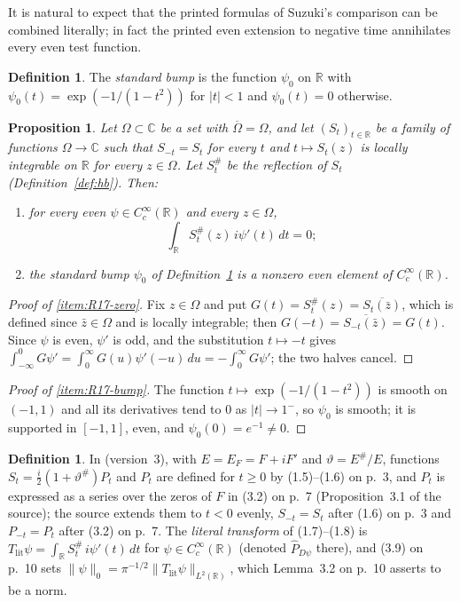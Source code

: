 \documentclass[11pt]{amsart}
\theoremstyle{plain}
\newtheorem{proposition}[theorem]{Proposition}
\theoremstyle{definition}
\newtheorem{definition}[theorem]{Definition}
\theoremstyle{remark}
\numberwithin{equation}{section}
\newcommand{\C}{\mathbb{C}}
\newcommand{\R}{\mathbb{R}}
\begin{document}
It is natural to expect that the printed formulas of Suzuki's comparison
can be combined literally; in fact the printed even extension to
negative time annihilates every even test function.

\begin{definition}\label{def:bump}
The \emph{standard bump} is the function $\psi_0$ on $\R$ with
$\psi_0(t)=\exp(-1/(1-t^2))$ for $|t|<1$ and $\psi_0(t)=0$ otherwise.
\end{definition}

\begin{proposition}\label{prop:R17}
Let $\Omega\subset\C$ be a set with $\overline\Omega=\Omega$, and let
$(S_t)_{t\in\R}$ be a family of functions $\Omega\to\C$ such that
$S_{-t}=S_t$ for every $t$ and $t\mapsto S_t(z)$ is locally integrable
on $\R$ for every $z\in\Omega$. Let $S_t^\#$ be the reflection of
$S_t$ (Definition~\ref{def:hb}). Then:
\begin{enumerate}[label=(\roman*)]
\item\label{item:R17-zero} for every even $\psi\in C_c^\infty(\R)$
  and every $z\in\Omega$,
  \[
  \int_\R S_t^\#(z)\,i\psi'(t)\,dt=0;
  \]
\item\label{item:R17-bump} the standard bump $\psi_0$ of
  Definition~\ref{def:bump} is a nonzero even element of
  $C_c^\infty(\R)$.
\end{enumerate}
\end{proposition}

\begin{proof}[Proof of \ref{item:R17-zero}]
Fix $z\in\Omega$ and put $G(t)=S_t^\#(z)=\overline{S_t(\bar z)}$,
which is defined since $\bar z\in\Omega$ and is locally integrable;
then $G(-t)=\overline{S_{-t}(\bar z)}=G(t)$. Since $\psi$ is even,
$\psi'$ is odd, and the substitution $t\mapsto-t$ gives
$\int_{-\infty}^0G\psi'=\int_0^\infty G(u)\psi'(-u)\,du
=-\int_0^\infty G\psi'$; the two halves cancel.
\end{proof}

\begin{proof}[Proof of \ref{item:R17-bump}]
The function $t\mapsto\exp(-1/(1-t^2))$ is smooth on $(-1,1)$ and all
its derivatives tend to $0$ as $|t|\to1^-$, so $\psi_0$ is smooth; it
is supported in $[-1,1]$, even, and $\psi_0(0)=e^{-1}\ne0$.
\end{proof}

\begin{definition}\label{def:suzuki-lit}
In \cite{Suzuki2023WeilHilbert} (version~3), with $E=E_F=F+iF'$ and
$\vartheta=E^\#/E$, functions $S_t=\tfrac i2(1+\vartheta^\#)P_t$ and
$P_t$ are defined for $t\ge0$ by (1.5)--(1.6) on p.~3, and $P_t$ is
expressed as a series over the zeros of $F$ in (3.2) on p.~7
(Proposition~3.1 of the source); the source extends them to $t<0$
evenly, $S_{-t}=S_t$ after (1.6) on p.~3 and $P_{-t}=P_t$ after (3.2)
on p.~7.
The \emph{literal transform} of (1.7)--(1.8) is
$T_{\mathrm{lit}}\psi=\int_\R S_t^\#\,i\psi'(t)\,dt$ for
$\psi\in C_c^\infty(\R)$ (denoted $\widehat P_{D\psi}$ there), and
(3.9) on p.~10 sets $\|\psi\|_0=\pi^{-1/2}\|T_{\mathrm{lit}}\psi\|_{
L^2(\R)}$, which Lemma~3.2 on p.~10 asserts to be a norm.
\end{definition}
\end{document}
